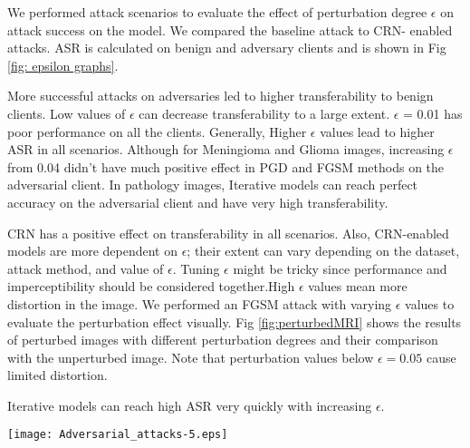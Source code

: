 We performed attack scenarios to evaluate the effect of perturbation degree $\epsilon$  on attack success on the model. We compared the baseline attack to CRN- enabled attacks. ASR is calculated on benign and adversary clients and is shown in Fig \ref{fig: epsilon graphs}.

More successful attacks on adversaries led to higher transferability to benign clients. Low values of $\epsilon$ can decrease transferability to a large extent. $\epsilon$ = 0.01 has poor performance on all the clients. Generally, Higher $\epsilon$ values lead to higher ASR in all scenarios. Although for Meningioma and Glioma images, increasing $\epsilon$ from 0.04 didn't have much positive effect in PGD and FGSM methods on the adversarial client. 
In pathology images, Iterative models can reach perfect accuracy on the adversarial client and have very high transferability.

CRN  has a positive effect on transferability in all scenarios. Also, CRN-enabled models are more dependent on $\epsilon$; their extent can vary depending on the dataset, attack method, and value of $\epsilon$.
Tuning $\epsilon$  might be tricky since performance and imperceptibility should be considered together.High $\epsilon$ values mean more distortion in the image. We performed an FGSM attack with varying $\epsilon$ values to evaluate the perturbation effect visually. Fig \ref{fig:perturbedMRI} shows the results of perturbed images with different perturbation degrees and their comparison with the unperturbed image. Note that perturbation values below  $\epsilon=0.05$ cause limited distortion.


Iterative models can reach high ASR very quickly with increasing $\epsilon$. 

\begin{figure*}[h!]
 \centering
 \texttt{[image: Adversarial\_attacks-5.eps]}
 \caption{\small From (a) to (f), normal tumor image, and petrurbed images with FGSM attack, with perturbation parameters: $\epsilon$ = 0.01, 0.03, 0.05,  0.10, respectively}
 \label{fig:perturbedMRI}
\end{figure*}











